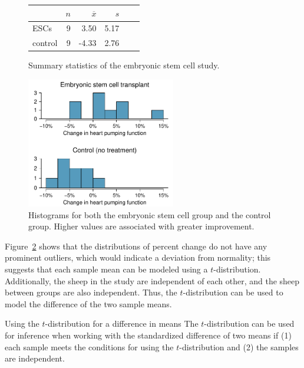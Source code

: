 \begin{figure}[h]
\centering
\begin{tabular}{l rrrrr}
\hline
\hspace{10mm}	& $n$	& $\overline{x}$	& $s$  	 \\
\hline
ESCs		& 9		& 3.50		& 5.17  	\\
control		& 9		& -4.33		& 2.76  	 \\
\hline
\end{tabular}
\caption{Summary statistics of the embryonic stem cell study.}
\label{summaryStatsForSheepHeartDataWhoReceivedMiceESCs}
\end{figure}

\textD{\newpage}

\begin{figure}[h]
	\centering
	\includegraphics[width=0.58\textwidth]{ch_inference_for_means_oi_biostat/figures/stemCellTherapyForHearts/stemCellTherapyForHearts}
	\caption{Histograms for both the embryonic stem cell group and the control group. Higher values are associated with greater improvement.}
	\label{stemCellTherapyForHearts}
\end{figure}

Figure~\ref{stemCellTherapyForHearts} shows that the distributions of percent change do not have any prominent outliers, which would indicate a deviation from normality; this suggests that each sample mean can be modeled using a $t$-distribution. Additionally, the sheep in the study are independent of each other, and the sheep between groups are also independent. Thus, the $t$-distribution can be used to model the difference of the two sample means.

\begin{onebox}{Using the $t$-distribution for a difference in means}
\label{ConditionsForTwoSampleTDist}The $t$-distribution can be used for inference when working with the standardized difference of two means if (1) each sample meets the conditions for using the $t$-distribution and (2) the samples are independent.
\end{onebox}

